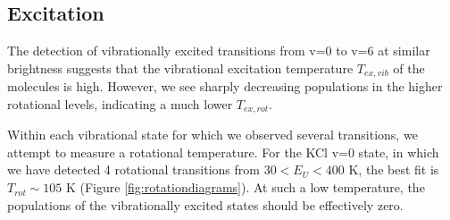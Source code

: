 \documentclass[twocolumn]{aastex62}
\begin{document}
\subsection{Excitation}
The detection of vibrationally excited transitions from v=0 to v=6 at similar
brightness suggests that the vibrational excitation temperature $T_{ex,vib}$ of
the molecules is high.  However, we see sharply decreasing populations in
the higher rotational levels, indicating a much lower $T_{ex,rot}$.




Within each vibrational state for which we observed several transitions, we attempt
to measure a rotational temperature.  For the KCl v=0 state, in which we have
detected 4 rotational transitions from $30 < E_U < 400$ K, the best fit
is $T_{rot}\sim105$ K (Figure
\ref{fig:rotationdiagrams}).  At such a low temperature, the populations of the
vibrationally excited states should be effectively zero.  
\end{document}
